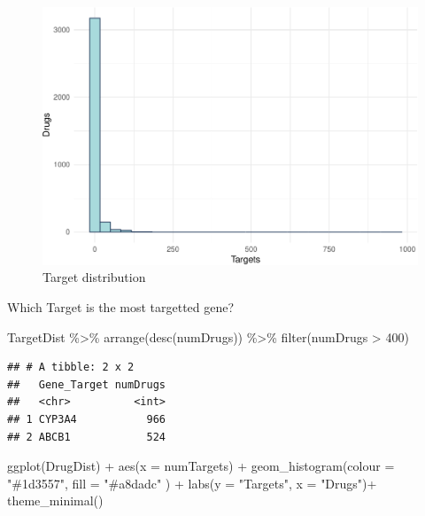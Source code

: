 \documentclass[
]{book}
\newenvironment{Shaded}{\begin{snugshade}}{\end{snugshade}}
\newcommand{\AttributeTok}[1]{\textcolor[rgb]{0.77,0.63,0.00}{#1}}
\newcommand{\DecValTok}[1]{\textcolor[rgb]{0.00,0.00,0.81}{#1}}
\newcommand{\FunctionTok}[1]{\textcolor[rgb]{0.00,0.00,0.00}{#1}}
\newcommand{\NormalTok}[1]{#1}
\newcommand{\SpecialCharTok}[1]{\textcolor[rgb]{0.00,0.00,0.00}{#1}}
\newcommand{\StringTok}[1]{\textcolor[rgb]{0.31,0.60,0.02}{#1}}
\begin{document}
\begin{figure}
\centering
\includegraphics{NetMed_files/figure-latex/unnamed-chunk-17-1.pdf}
\caption{\label{fig:unnamed-chunk-17}Target distribution}
\end{figure}

Which Target is the most targetted gene?

\begin{Shaded}
\begin{Highlighting}[]
\NormalTok{TargetDist }\SpecialCharTok{\%\textgreater{}\%}
  \FunctionTok{arrange}\NormalTok{(}\FunctionTok{desc}\NormalTok{(numDrugs)) }\SpecialCharTok{\%\textgreater{}\%}
  \FunctionTok{filter}\NormalTok{(numDrugs }\SpecialCharTok{\textgreater{}} \DecValTok{400}\NormalTok{)}
\end{Highlighting}
\end{Shaded}

\begin{verbatim}
## # A tibble: 2 x 2
##   Gene_Target numDrugs
##   <chr>          <int>
## 1 CYP3A4           966
## 2 ABCB1            524
\end{verbatim}

\begin{Shaded}
\begin{Highlighting}[]
\FunctionTok{ggplot}\NormalTok{(DrugDist) }\SpecialCharTok{+}
  \FunctionTok{aes}\NormalTok{(}\AttributeTok{x =}\NormalTok{ numTargets) }\SpecialCharTok{+}
  \FunctionTok{geom\_histogram}\NormalTok{(}\AttributeTok{colour =} \StringTok{"\#1d3557"}\NormalTok{, }\AttributeTok{fill =} \StringTok{"\#a8dadc"}\NormalTok{ ) }\SpecialCharTok{+}
  \FunctionTok{labs}\NormalTok{(}\AttributeTok{y =} \StringTok{"Targets"}\NormalTok{, }\AttributeTok{x =} \StringTok{"Drugs"}\NormalTok{)}\SpecialCharTok{+}
  \FunctionTok{theme\_minimal}\NormalTok{()}
\end{Highlighting}
\end{Shaded}
\end{document}
